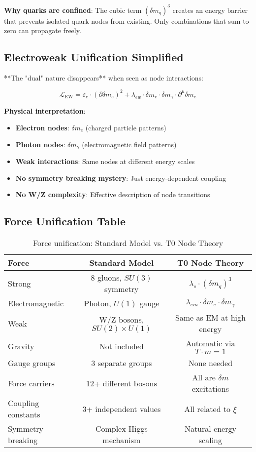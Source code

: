 \documentclass[12pt,a4paper]{article}
\newcommand{\Lag}{\mathcal{L}}
\newcommand{\deltam}{\delta m}
\newcommand{\xipar}{\xi}
\theoremstyle{definition}
\theoremstyle{remark}
\begin{document}
	\textbf{Why quarks are confined}:
	The cubic term $(\deltam_q)^3$ creates an energy barrier that prevents isolated quark nodes from existing. Only combinations that sum to zero can propagate freely.
	
	\subsection{Electroweak Unification Simplified}
	
	**The "dual" nature disappears** when seen as node interactions:
	
	\begin{equation}
		\Lag_{\text{EW}} = \varepsilon_e \cdot (\partial \deltam_e)^2 + \lambda_{ew} \cdot \deltam_e \cdot \deltam_\gamma \cdot \partial^\mu \deltam_e
	\end{equation}
	
	\textbf{Physical interpretation}:
	\begin{itemize}
		\item \textbf{Electron nodes}: $\deltam_e$ (charged particle patterns)
		\item \textbf{Photon nodes}: $\deltam_\gamma$ (electromagnetic field patterns)
		\item \textbf{Weak interactions}: Same nodes at different energy scales
		\item \textbf{No symmetry breaking mystery}: Just energy-dependent coupling
		\item \textbf{No W/Z complexity}: Effective description of node transitions
	\end{itemize}
	
	\subsection{Force Unification Table}
	
	\begin{table}[htbp]
		\centering
		\begin{tabular}{lcc}
			\toprule
			\textbf{Force} & \textbf{Standard Model} & \textbf{T0 Node Theory} \\
			\midrule
			Strong & 8 gluons, $SU(3)$ symmetry & $\lambda_s \cdot (\deltam_q)^3$ \\
			Electromagnetic & Photon, $U(1)$ gauge & $\lambda_{em} \cdot \deltam_e \cdot \deltam_\gamma$ \\
			Weak & W/Z bosons, $SU(2) \times U(1)$ & Same as EM at high energy \\
			Gravity & Not included & Automatic via $T \cdot m = 1$ \\
			\midrule
			Gauge groups & 3 separate groups & None needed \\
			Force carriers & 12+ different bosons & All are $\deltam$ excitations \\
			Coupling constants & 3+ independent values & All related to $\xipar$ \\
			Symmetry breaking & Complex Higgs mechanism & Natural energy scaling \\
			\bottomrule
		\end{tabular}
		\caption{Force unification: Standard Model vs. T0 Node Theory}
		\label{tab:force_unification}
	\end{table}
	
\end{document}
